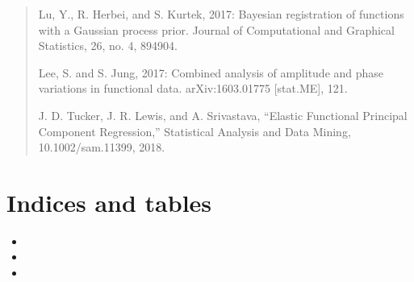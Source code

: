 \documentclass[letterpaper,10pt,english]{sphinxmanual}
\begin{document}
\begin{quote}
Lu, Y., R. Herbei, and S. Kurtek, 2017: Bayesian registration of functions with a Gaussian process prior. Journal of
Computational and Graphical Statistics, 26, no. 4, 894\textendash{}904.

Lee, S. and S. Jung, 2017: Combined analysis of amplitude and phase variations
in functional data. arXiv:1603.01775 {[}stat.ME{]}, 1\sphinxhyphen{}21.

J. D. Tucker, J. R. Lewis, and A. Srivastava, “Elastic Functional Principal
Component Regression,” Statistical Analysis and Data Mining, 10.1002/sam.11399, 2018.
\end{quote}


\chapter{Indices and tables}
\label{\detokenize{index:indices-and-tables}}\begin{itemize}
\item {} 

\item {} 

\item {} 

\end{itemize}
\end{document}
